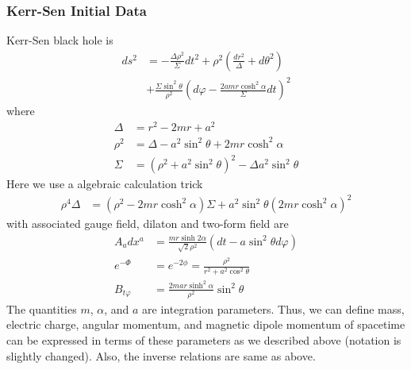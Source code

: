\documentclass[%
 reprint,
 amsmath,amssymb,
 aps,
]{revtex4-1}
\begin{document}
\subsubsection{Kerr-Sen Initial Data}
Kerr-Sen black hole is 
\begin{align}
ds^2 &= - \frac{\Delta \rho^2}{\Sigma} dt^2 + \rho^2 \left( \frac{dr^2}{\Delta} + d \theta^2 \right) \nonumber \\
& + \frac{\Sigma \sin^2 \theta}{\rho^2} \left(d \varphi - \frac{2 a m r \cosh^2 \alpha}{\Sigma} dt \right)^2
\end{align}
where
\begin{align}
\Delta &=r^2 - 2mr + a^2 \\
\rho^2 &=\Delta - a^2 \sin^2 \theta + 2mr \cosh^2 \alpha \\
\Sigma &= (\rho^2 + a^2 \sin^2 \theta)^2 - \Delta a^2 \sin^2 \theta
\end{align}
Here we use a algebraic calculation trick
\begin{align}
\rho^4 \Delta &=(\rho^2 - 2 m r \cosh^2 \alpha) \Sigma + a^2 \sin^2 \theta(2 m r \cosh^2 \alpha)^2
\end{align}
with associated gauge field, dilaton and two-form field are
\begin{align}
A_a dx^a &= \frac{m r \sinh 2 \alpha}{\sqrt{2} \rho^2} (dt - a \sin^2 \theta d \varphi) \\
e^{-\Phi} &= e^{-2 \phi} = \frac{\rho^2}{r^2 + a^2 \cos^2 \theta} \\
B_{t \varphi} &= \frac{2 m a r \sinh^2 \alpha}{\rho^2} \sin^2 \theta
\end{align}
The quantities $m$, $\alpha$, and $a$ are integration parameters. Thus, we can define mass, electric charge, angular momentum, and magnetic dipole momentum of spacetime can be expressed in terms of these parameters as we described above (notation is slightly changed). Also, the inverse relations are same as above.
\end{document}

